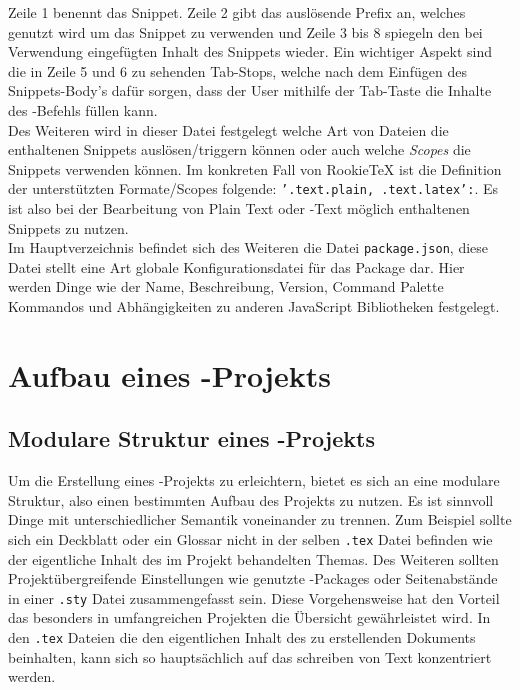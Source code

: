         Zeile 1 benennt das Snippet. Zeile 2 gibt das auslösende Prefix an, welches genutzt wird um das Snippet zu verwenden und Zeile 3 bis 8 spiegeln den bei Verwendung eingefügten Inhalt des Snippets wieder. Ein wichtiger Aspekt sind die in Zeile 5 und 6 zu sehenden Tab-Stops, welche nach dem Einfügen des Snippets-Body's dafür sorgen, dass der User mithilfe der Tab-Taste die Inhalte des \tex-Befehls füllen kann.
        \\
        Des Weiteren wird in dieser Datei festgelegt welche Art von Dateien die enthaltenen Snippets auslösen/triggern können oder auch welche \textit{Scopes} die Snippets verwenden können. Im konkreten Fall von RookieTeX ist die Definition der unterstützten Formate/Scopes folgende: \texttt{'.text.plain, .text.latex':}. Es ist also bei der Bearbeitung von Plain Text oder \latex-Text möglich enthaltenen Snippets zu nutzen.
        \\
        Im Hauptverzeichnis befindet sich des Weiteren die Datei \texttt{package.json}, diese Datei stellt eine Art globale Konfigurationsdatei für das Package dar. Hier werden Dinge wie der Name, Beschreibung, Version, Command Palette Kommandos und Abhängigkeiten zu anderen JavaScript Bibliotheken festgelegt.

\chapter{Aufbau eines \tex-Projekts}
    \section{Modulare Struktur eines \tex-Projekts}
    Um die Erstellung eines \tex-Projekts zu erleichtern, bietet es sich an eine modulare Struktur, also einen bestimmten Aufbau des Projekts zu nutzen. Es ist sinnvoll Dinge mit unterschiedlicher Semantik voneinander zu trennen. Zum Beispiel sollte sich ein Deckblatt oder ein Glossar nicht in der selben \texttt{.tex} Datei befinden wie der eigentliche Inhalt des im Projekt behandelten Themas. Des Weiteren sollten Projektübergreifende Einstellungen wie genutzte \latex-Packages oder Seitenabstände in einer \texttt{.sty} Datei zusammengefasst sein. Diese Vorgehensweise hat den Vorteil das besonders in umfangreichen Projekten die Übersicht gewährleistet wird. In den \texttt{.tex} Dateien die den eigentlichen Inhalt des zu erstellenden Dokuments beinhalten, kann sich so hauptsächlich auf das schreiben von Text konzentriert werden.


